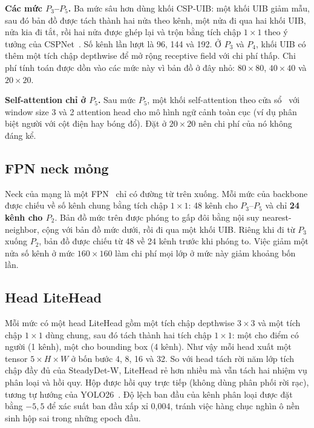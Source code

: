 \textbf{Các mức $P_3$--$P_5$.} Ba mức sâu hơn dùng khối CSP-UIB: một khối UIB giảm mẫu, sau đó bản đồ được tách thành hai nửa theo kênh, một nửa đi qua hai khối UIB, nửa kia đi tắt, rồi hai nửa được ghép lại và trộn bằng tích chập $1\times1$ theo ý tưởng của CSPNet~\cite{wang2020cspnet}. Số kênh lần lượt là 96, 144 và 192. Ở $P_3$ và $P_4$, khối UIB có thêm một tích chập depthwise để mở rộng receptive field với chi phí thấp. Chi phí tính toán được dồn vào các mức này vì bản đồ ở đây nhỏ: $80\times80$, $40\times40$ và $20\times20$.

\textbf{Self-attention chỉ ở $P_5$.} Sau mức $P_5$, một khối self-attention theo cửa sổ~\cite{liu2021swin} với window size 3 và 2 attention head cho mô hình ngữ cảnh toàn cục (ví dụ phân biệt người với cột điện hay bóng đổ). Đặt ở $20\times20$ nên chi phí của nó không đáng kể.

\subsection{FPN neck mỏng}

Neck của mạng là một FPN~\cite{lin2017fpn} chỉ có đường từ trên xuống. Mỗi mức của backbone được chiếu về số kênh chung bằng tích chập $1\times1$: 48 kênh cho $P_3$--$P_5$ và chỉ \textbf{24 kênh cho $P_2$}. Bản đồ mức trên được phóng to gấp đôi bằng nội suy nearest-neighbor, cộng với bản đồ mức dưới, rồi đi qua một khối UIB. Riêng khi đi từ $P_3$ xuống $P_2$, bản đồ được chiếu từ 48 về 24 kênh trước khi phóng to. Việc giảm một nửa số kênh ở mức $160\times160$ làm chi phí mọi lớp ở mức này giảm khoảng bốn lần.

\subsection{Head LiteHead}

Mỗi mức có một head LiteHead gồm một tích chập depthwise $3\times3$ và một tích chập $1\times1$ dùng chung, sau đó tách thành hai tích chập $1\times1$: một cho điểm có người (1 kênh), một cho bounding box (4 kênh). Như vậy mỗi head xuất một tensor $5 \times H \times W$ ở bốn bước 4, 8, 16 và 32. So với head tách rời năm lớp tích chập đầy đủ của SteadyDet-W, LiteHead rẻ hơn nhiều mà vẫn tách hai nhiệm vụ phân loại và hồi quy. Hộp được hồi quy trực tiếp (không dùng phân phối rời rạc), tương tự hướng của YOLO26~\cite{ultralytics}. Độ lệch ban đầu của kênh phân loại được đặt bằng $-5{,}5$ để xác suất ban đầu xấp xỉ 0,004, tránh việc hàng chục nghìn ô nền sinh hộp sai trong những epoch đầu.

